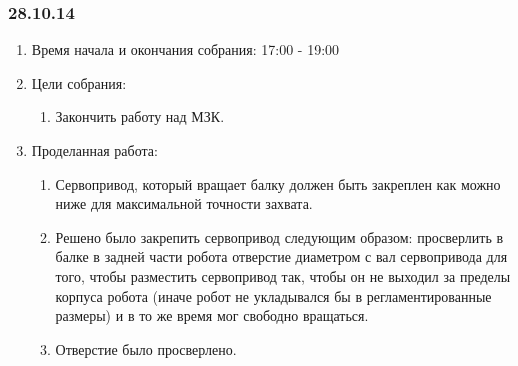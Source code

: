 
\subsubsection{28.10.14}

\begin{enumerate}
	\item Время начала и окончания собрания:
	17:00 - 19:00
	\item Цели собрания:
	\begin{enumerate}
	  \item Закончить работу над МЗК.
	  
    \end{enumerate}
    
	\item Проделанная работа:
	\begin{enumerate}
	  \item Сервопривод, который вращает балку должен быть закреплен как можно ниже для максимальной точности захвата.
      
      \item Решено было закрепить сервопривод следующим образом: просверлить в балке в задней части робота отверстие диаметром с вал сервопривода для того, чтобы разместить сервопривод так, чтобы он не выходил за пределы корпуса робота (иначе робот не укладывался бы в регламентированные размеры) и в то же время мог свободно вращаться.
      
      \item Отверстие было просверлено.
      

\end{enumerate}
\end{enumerate}
